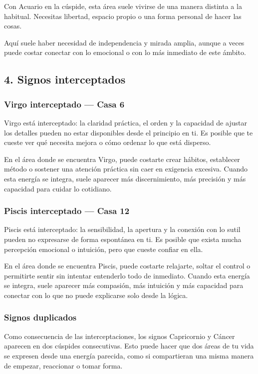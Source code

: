 \documentclass[11pt,a4paper]{article}
\begin{document}
Con Acuario en la cúspide, esta área suele vivirse de una manera distinta a la habitual. Necesitas libertad, espacio propio o una forma personal de hacer las cosas.

Aquí suele haber necesidad de independencia y mirada amplia, aunque a veces puede costar conectar con lo emocional o con lo más inmediato de este ámbito.



\vspace{0.5cm}

\subsection{4. Signos interceptados}

\subsubsection*{Virgo interceptado — Casa 6}
Virgo está interceptado: la claridad práctica, el orden y la capacidad de ajustar los detalles pueden no estar disponibles desde el principio en ti. Es posible que te cueste ver qué necesita mejora o cómo ordenar lo que está disperso.

En el área donde se encuentra Virgo, puede costarte crear hábitos, establecer método o sostener una atención práctica sin caer en exigencia excesiva. Cuando esta energía se integra, suele aparecer más discernimiento, más precisión y más capacidad para cuidar lo cotidiano.

\subsubsection*{Piscis interceptado — Casa 12}
Piscis está interceptado: la sensibilidad, la apertura y la conexión con lo sutil pueden no expresarse de forma espontánea en ti. Es posible que exista mucha percepción emocional o intuición, pero que cueste confiar en ella.

En el área donde se encuentra Piscis, puede costarte relajarte, soltar el control o permitirte sentir sin intentar entenderlo todo de inmediato. Cuando esta energía se integra, suele aparecer más compasión, más intuición y más capacidad para conectar con lo que no puede explicarse solo desde la lógica.

\subsubsection*{Signos duplicados}
Como consecuencia de las interceptaciones, los signos Capricornio y Cáncer aparecen en dos cúspides consecutivas. Esto puede hacer que dos áreas de tu vida se expresen desde una energía parecida, como si compartieran una misma manera de empezar, reaccionar o tomar forma.
\end{document}

